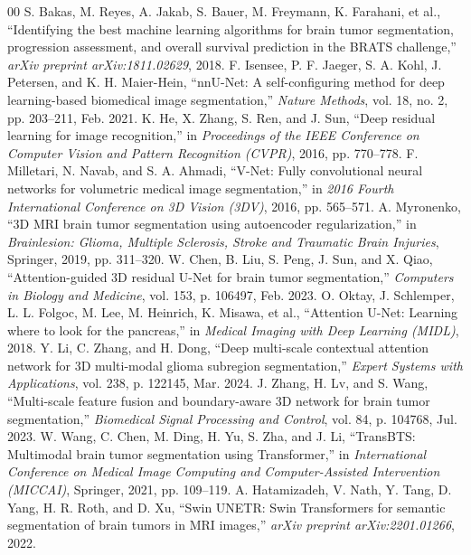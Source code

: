 \documentclass[conference]{IEEEtran}
\begin{document}
\begin{thebibliography}{00}
 S. Bakas, M. Reyes, A. Jakab, S. Bauer, M. Freymann, K. Farahani, et al., ``Identifying the best machine learning algorithms for brain tumor segmentation, progression assessment, and overall survival prediction in the BRATS challenge,'' \emph{arXiv preprint arXiv:1811.02629}, 2018.
 F. Isensee, P. F. Jaeger, S. A. Kohl, J. Petersen, and K. H. Maier-Hein, ``nnU-Net: A self-configuring method for deep learning-based biomedical image segmentation,'' \emph{Nature Methods}, vol. 18, no. 2, pp. 203--211, Feb. 2021.
 K. He, X. Zhang, S. Ren, and J. Sun, ``Deep residual learning for image recognition,'' in \emph{Proceedings of the IEEE Conference on Computer Vision and Pattern Recognition (CVPR)}, 2016, pp. 770--778.
 F. Milletari, N. Navab, and S. A. Ahmadi, ``V-Net: Fully convolutional neural networks for volumetric medical image segmentation,'' in \emph{2016 Fourth International Conference on 3D Vision (3DV)}, 2016, pp. 565--571.
 A. Myronenko, ``3D MRI brain tumor segmentation using autoencoder regularization,'' in \emph{Brainlesion: Glioma, Multiple Sclerosis, Stroke and Traumatic Brain Injuries}, Springer, 2019, pp. 311--320.
 W. Chen, B. Liu, S. Peng, J. Sun, and X. Qiao, ``Attention-guided 3D residual U-Net for brain tumor segmentation,'' \emph{Computers in Biology and Medicine}, vol. 153, p. 106497, Feb. 2023.
 O. Oktay, J. Schlemper, L. L. Folgoc, M. Lee, M. Heinrich, K. Misawa, et al., ``Attention U-Net: Learning where to look for the pancreas,'' in \emph{Medical Imaging with Deep Learning (MIDL)}, 2018.
 Y. Li, C. Zhang, and H. Dong, ``Deep multi-scale contextual attention network for 3D multi-modal glioma subregion segmentation,'' \emph{Expert Systems with Applications}, vol. 238, p. 122145, Mar. 2024.
 J. Zhang, H. Lv, and S. Wang, ``Multi-scale feature fusion and boundary-aware 3D network for brain tumor segmentation,'' \emph{Biomedical Signal Processing and Control}, vol. 84, p. 104768, Jul. 2023.
 W. Wang, C. Chen, M. Ding, H. Yu, S. Zha, and J. Li, ``TransBTS: Multimodal brain tumor segmentation using Transformer,'' in \emph{International Conference on Medical Image Computing and Computer-Assisted Intervention (MICCAI)}, Springer, 2021, pp. 109--119.
 A. Hatamizadeh, V. Nath, Y. Tang, D. Yang, H. R. Roth, and D. Xu, ``Swin UNETR: Swin Transformers for semantic segmentation of brain tumors in MRI images,'' \emph{arXiv preprint arXiv:2201.01266}, 2022.

\end{thebibliography}
\end{document}
